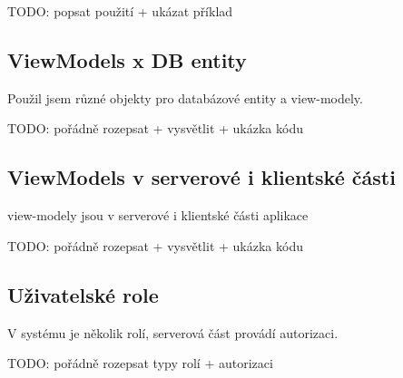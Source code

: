 TODO: popsat použití + ukázat příklad

\subsection{ViewModels x DB entity}

Použil jsem různé objekty pro databázové entity a view-modely.

TODO: pořádně rozepsat + vysvětlit + ukázka kódu

\subsection{ViewModels v serverové i klientské části}

view-modely jsou v serverové i klientské části aplikace

TODO: pořádně rozepsat + vysvětlit + ukázka kódu

\subsection{Uživatelské role}

V systému je několik rolí, serverová část provádí autorizaci.

TODO: pořádně rozepsat typy rolí + autorizaci
